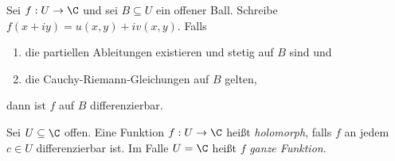 		\begin{thm}
			Sei $ f: U \to \C $ und sei $ B \subseteq U $ ein offener Ball. Schreibe $ f(x+iy) = u(x,y) + iv(x,y) $. Falls 
			\begin{enumerate}[label={\roman*})]
				\item die partiellen Ableitungen existieren und stetig auf $B$ sind und
				\item die Cauchy-Riemann-Gleichungen auf $B$ gelten,
			\end{enumerate}
			dann ist $f$ auf $B$ differenzierbar.
		\end{thm}
		
		\begin{defn}[Holomorphie]
			Sei $U \subseteq \C$ offen. Eine Funktion $ f: U \to \C $ heißt \emph{holomorph}, falls $f$ an jedem $ c \in U $ differenzierbar ist. Im Falle $ U = \C $ heißt $f$ \emph{ganze Funktion}.
		\end{defn}
		
